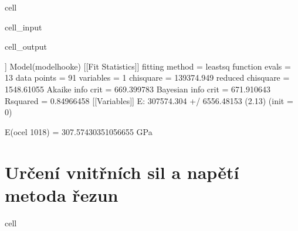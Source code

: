 \documentclass[letterpaper,10pt,english]{jupyterBook}
\begin{document}
{{\begin{sphinxuseclass}{cell}
\begin{sphinxVerbatimInput}
\begin{sphinxuseclass}{cell_input}
\begin{sphinxVerbatim}[commandchars=\\\{\}]
\PYG{p}{[}\PYG{p}{]}
\end{sphinxVerbatim}

\end{sphinxuseclass}\end{sphinxVerbatimInput}
\begin{sphinxVerbatimOutput}

\begin{sphinxuseclass}{cell_output}
\begin{sphinxVerbatim}[commandchars=\\\{\}]
[[Model]]
    Model(model\PYGZus{}hooke)
[[Fit Statistics]]
    \PYGZsh{} fitting method   = leastsq
    \PYGZsh{} function evals   = 13
    \PYGZsh{} data points      = 91
    \PYGZsh{} variables        = 1
    chi\PYGZhy{}square         = 139374.949
    reduced chi\PYGZhy{}square = 1548.61055
    Akaike info crit   = 669.399783
    Bayesian info crit = 671.910643
    R\PYGZhy{}squared          = 0.84966458
[[Variables]]
    E:  307574.304 +/\PYGZhy{} 6556.48153 (2.13\PYGZpc{}) (init = 0)
\end{sphinxVerbatim}

\noindent{}

\begin{sphinxVerbatim}[commandchars=\\\{\}]
E(ocel 1018) = 307.57430351056655 GPa
\end{sphinxVerbatim}

\end{sphinxuseclass}\end{sphinxVerbatimOutput}

\end{sphinxuseclass}
\sphinxstepscope


\section{Určení vnitřních sil a napětí \sphinxhyphen{} metoda řezun}
\label{\detokenize{Prednasky/2_5_Metoda__u0159ezu:urceni-vnitrnich-sil-a-napeti-metoda-rezun}}\label{\detokenize{Prednasky/2_5_Metoda__u0159ezu::doc}}
\begin{sphinxuseclass}{cell}\begin{sphinxVerbatimInput}


\end{sphinxVerbatimInput}
\end{sphinxuseclass}}}
\end{document}

